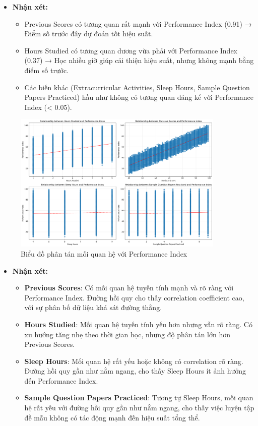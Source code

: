 \begin{itemize}
	\item \textbf{Nhận xét:}
	      \begin{itemize}
		      \item Previous Scores có tương quan rất mạnh với Performance Index (0.91) → Điểm số trước đây dự đoán tốt hiệu suất.
		      \item Hours Studied có tương quan dương vừa phải với Performance Index (0.37) → Học nhiều giờ giúp cải thiện hiệu suất, nhưng không mạnh bằng điểm số trước.
		      \item Các biến khác (Extracurricular Activities, Sleep Hours, Sample Question Papers Practiced) hầu như không có tương quan đáng kể với Performance Index (< 0.05).
	      \end{itemize}
\end{itemize}

\begin{figure}[H]
	\centering
	\includegraphics[width=0.9\textwidth]{imgs/figures/figure5_scatter_plots_relationships.png}
	\caption{Biểu đồ phân tán mối quan hệ với Performance Index}
	\label{fig:scatter}
\end{figure}

\begin{itemize}
	\item \textbf{Nhận xét:}
	      \begin{itemize}
		      \item \textbf{Previous Scores}: Có mối quan hệ tuyến tính mạnh và rõ ràng với Performance Index. Đường hồi quy cho thấy correlation coefficient cao, với sự phân bố dữ liệu khá sát đường thẳng.
		      \item \textbf{Hours Studied}: Mối quan hệ tuyến tính yếu hơn nhưng vẫn rõ ràng. Có xu hướng tăng nhẹ theo thời gian học, nhưng độ phân tán lớn hơn Previous Scores.
		      \item \textbf{Sleep Hours}: Mối quan hệ rất yếu hoặc không có correlation rõ ràng. Đường hồi quy gần như nằm ngang, cho thấy Sleep Hours ít ảnh hưởng đến Performance Index.
		      \item \textbf{Sample Question Papers Practiced}: Tương tự Sleep Hours, mối quan hệ rất yếu với đường hồi quy gần như nằm ngang, cho thấy việc luyện tập đề mẫu không có tác động mạnh đến hiệu suất tổng thể.
	      \end{itemize}
\end{itemize}

